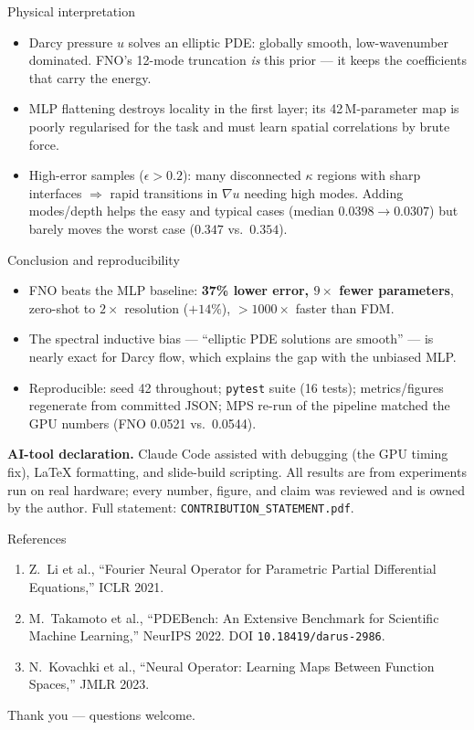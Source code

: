 \documentclass[aspectratio=169,11pt]{beamer}
\begin{document}
\begin{frame}{Physical interpretation}
\begin{itemize}
  \item Darcy pressure $u$ solves an elliptic PDE: globally smooth, low-wavenumber dominated. FNO's 12-mode truncation \emph{is} this prior --- it keeps the coefficients that carry the energy.
  \item MLP flattening destroys locality in the first layer; its 42\,M-parameter map is poorly regularised for the task and must learn spatial correlations by brute force.
  \item High-error samples ($\epsilon > 0.2$): many disconnected $\kappa$ regions with sharp interfaces $\Rightarrow$ rapid transitions in $\nabla u$ needing high modes. Adding modes/depth helps the easy and typical cases (median $0.0398 \to 0.0307$) but barely moves the worst case ($0.347$ vs.\ $0.354$).
\end{itemize}
\end{frame}

\begin{frame}{Conclusion and reproducibility}
\begin{itemize}
  \item FNO beats the MLP baseline: \textbf{37\% lower error, $9\times$ fewer parameters}, zero-shot to $2\times$ resolution ($+14\%$), $>1000\times$ faster than FDM.
  \item The spectral inductive bias --- ``elliptic PDE solutions are smooth'' --- is nearly exact for Darcy flow, which explains the gap with the unbiased MLP.
  \item Reproducible: seed 42 throughout; \texttt{pytest} suite (16 tests); metrics/figures regenerate from committed JSON; MPS re-run of the pipeline matched the GPU numbers (FNO 0.0521 vs.\ 0.0544).
\end{itemize}
\vfill
\footnotesize \textbf{AI-tool declaration.} Claude Code assisted with debugging (the GPU timing fix), LaTeX formatting, and slide-build scripting. All results are from experiments run on real hardware; every number, figure, and claim was reviewed and is owned by the author. Full statement: \texttt{CONTRIBUTION\_STATEMENT.pdf}.
\end{frame}

\begin{frame}{References}
\footnotesize
\begin{enumerate}
  \item Z.\ Li et al., ``Fourier Neural Operator for Parametric Partial Differential Equations,'' ICLR 2021.
  \item M.\ Takamoto et al., ``PDEBench: An Extensive Benchmark for Scientific Machine Learning,'' NeurIPS 2022. DOI \texttt{10.18419/darus-2986}.
  \item N.\ Kovachki et al., ``Neural Operator: Learning Maps Between Function Spaces,'' JMLR 2023.
\end{enumerate}
\vfill
\centering Thank you --- questions welcome.
\end{frame}
\end{document}
